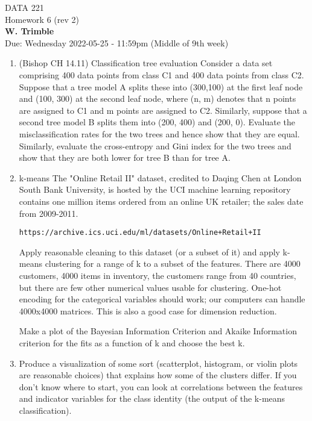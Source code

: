 \documentclass[12pt]{book}
\theoremstyle{definition}
\begin{document}
\begin{center}
{\Large DATA 221 \\  Homework 6  (rev 2)}\\
\textbf{W. Trimble}\\ %
Due: Wednesday 2022-05-25  - 11:59pm  (Middle of 9th week)
\end{center}

\vspace{0.2 cm}

\begin{enumerate}

\item
(Bishop CH 14.11)  Classification tree evaluation
Consider a data set comprising 400 data points from class C1 and 400 data points from class C2. Suppose that a tree model A splits these into (300,100) at the first leaf node and (100, 300) at the second leaf node, where (n, m) denotes that n points are assigned to C1 and m points are assigned to C2. Similarly, suppose that a second tree model B splits them into (200, 400) and (200, 0). Evaluate the misclassification rates for the two trees and hence show that they are equal. Similarly, evaluate the cross-entropy and Gini index for the two trees and show that they are both lower for tree B than for tree A.

\item
k-means 
The "Online Retail II" dataset, credited to Daqing Chen at London South Bank University, is hosted by the UCI machine learning repository contains one million items ordered from an online UK retailer; the sales date from 2009-2011.

\texttt{https://archive.ics.uci.edu/ml/datasets/Online+Retail+II}

Apply reasonable cleaning to this dataset (or a subset of it) and apply k-means clustering for a range of k to a subset of the features. 
There are 4000 customers, 4000 items in inventory, the customers range from 40 countries, but there are few other numerical values 
usable for clustering.  One-hot encoding for the categorical variables should work; our computers can handle 4000x4000 matrices. 
This is also a good case for dimension reduction.

Make a plot of the Bayesian Information Criterion and Akaike Information criterion for the fits as a function of k and choose the best k.

\item
Produce a visualization of some sort (scatterplot, histogram, or violin plots are reasonable choices) that explains how some of the clusters differ.  If you don't know where to start, you can look at correlations between the features and indicator variables for the class identity  (the output of the k-means classification).   


\end{enumerate}
\end{document}
